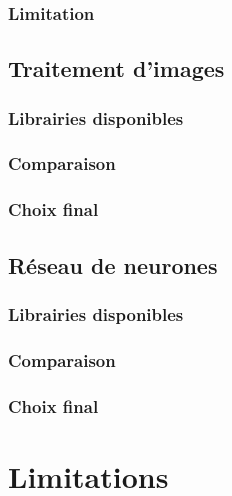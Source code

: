 \subsubsection{Limitation}

\subsection{Traitement d'images}
\subsubsection{Librairies disponibles}
\subsubsection{Comparaison}
\subsubsection{Choix final}

\subsection{Réseau de neurones}
\subsubsection{Librairies disponibles}
\subsubsection{Comparaison}
\subsubsection{Choix final}
































\section{Limitations}